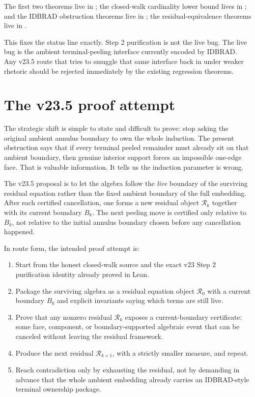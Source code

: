 \documentclass[11pt]{article}
\begin{document}
The first two theorems live in
; the closed-walk
cardinality lower bound lives in
; and the
IDBRAD obstruction theorems live in
;
the residual-equivalence theorems live in
.

This fixes the status line exactly.  Step 2 purification is not the live bug.
The live bug is the ambient terminal-peeling interface currently encoded by
IDBRAD.  Any v23.5 route that tries to smuggle that same interface back in
under weaker rhetoric should be rejected immediately by the existing regression
theorems.

\section{The v23.5 proof attempt}

The strategic shift is simple to state and difficult to prove: stop asking the
original ambient annulus boundary to own the whole induction.  The present
obstruction says that if every terminal peeled remainder must already sit on
that ambient boundary, then genuine interior support forces an impossible
one-edge face.  That is valuable information.  It tells us the induction
parameter is wrong.

The v23.5 proposal is to let the algebra follow the \emph{live} boundary of the
surviving residual equation rather than the fixed ambient boundary of the full
embedding.  After each certified cancellation, one forms a new residual object
\(\mathcal{R}_k\) together with its current boundary \(B_k\).  The next peeling
move is certified only relative to \(B_k\), not relative to the initial annulus
boundary chosen before any cancellation happened.

In route form, the intended proof attempt is:
\begin{enumerate}[leftmargin=2em]
\item Start from the honest closed-walk source and the exact v23 Step 2
purification identity already proved in Lean.
\item Package the surviving algebra as a residual equation object
\(\mathcal{R}_0\) with a current boundary \(B_0\) and explicit invariants saying
which terms are still live.
\item Prove that any nonzero residual \(\mathcal{R}_k\) exposes a
current-boundary certificate: some face, component, or boundary-supported
algebraic event that can be canceled without leaving the residual framework.
\item Produce the next residual \(\mathcal{R}_{k+1}\), with a strictly smaller
measure, and repeat.
\item Reach contradiction only by exhausting the residual, not by demanding in
advance that the whole ambient embedding already carries an IDBRAD-style
terminal ownership package.
\end{enumerate}
\end{document}
